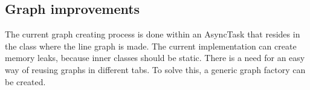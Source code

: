 \subsection{Graph improvements}
The current graph creating process is done within an AsyncTask that resides in the class where the line graph is made. The current implementation can create memory leaks, because inner classes should be static. There is a need for an easy way of reusing graphs in different tabs. To solve this, a generic graph factory can be created.
